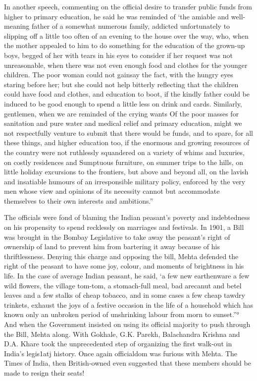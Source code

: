 In another speech, commenting on the official desire to transfer public funds from higher to primary education, he said he was reminded of ‘the amiable and well-meaning father of a somewhat numerous family, addicted unfortunately to slipping off a little too often of an evening to the house over the way, who, when the mother appealed to him to do something for the education of the grown-up boys, begged of her with tears in his eyes to consider if her request was not unreasonable, when there was not even enough food and clothes for the younger children. The poor woman could not gainsay the fact, with the hungry eyes staring before her; but she could not help bitterly reflecting that the children could have food and clothes, and education to boot, if the kindly father could be induced to be good enough to spend a little less on drink and cards. Similarly, gentlemen, when we are reminded of the crying wants Of the poor masses for sanitation and pure water and medical relief and primary education, might we not respectfully venture to submit that there would be funds, and to spare, for all these things, and higher education too, if the enormous and growing resources of the country were not ruthlessly squandered on a variety of whims and luxuries, on costly residences and Sumptuous furniture, on summer trips to the hills, on little holiday excursions to the frontiers, but above and beyond all, on the lavish and insatiable humours of an irresponsible military policy, enforced by the very men whose view and opinions of its necessity cannot but accommodate themselves to their own interests and ambitions.”

The officials were fond of blaming the Indian peasant’s poverty and indebtedness on his propensity to spend recklessly on marriages and festivals. In 1901, a Bill was brought in the Bombay Legislative to take away the peasant’s right of ownership of land to prevent him from bartering it away because of his thriftlessness. Denying this charge and opposing the bill, Mehta defended the right of the peasant to have some joy, colour, and moments of brightness in his life. In the case of average Indian peasant, he said, ‘a few new earthenware a few wild flowers, the village tom-tom, a stomach-full meal, bad arecanut and betel leaves and a few stalks of cheap tobacco, and in some cases a few cheap tawdry trinkets, exhaust the joys of a festive occasion in the life of a household which has known only an unbroken period of unshrinking labour from morn to sunset.”° And when the Government insisted on using its official majority to push through the Bill, Mehta along. With Gokhale, G.K. Parekh, Balachandra Krishna and D.A. Khare took the unprecedented step of organizing the first walk-out in India’s legis1atj history. Once again officialdom was furious with Mehta. The Times of India, then British-owned even suggested that these members should be made to resign their seats!

